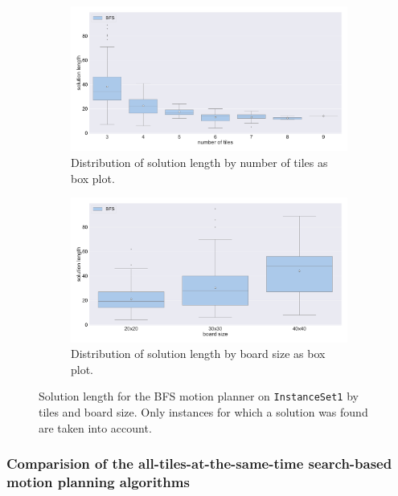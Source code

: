 \begin{figure}[H]
\begin{subfigure}[b]{\textwidth}
\centering
\includegraphics[width=\textwidth]{figures/plots/heuristic_solvers_i1/bfs_solution_length_over_tiles.pdf}
\caption{Distribution of solution length by number of tiles as box plot.}
\label{fig:bfs_solution_length_over_tiles}
\end{subfigure}
\begin{subfigure}[b]{\textwidth}
\centering
\includegraphics[width=\textwidth]{figures/plots/heuristic_solvers_i1/bfs_solution_length_over_board_size.pdf}
\caption{Distribution of solution length by board size as box plot.}
\label{fig:bfs_solution_length_over_board_size}
\end{subfigure}
\caption[Solution lengths for BFS motion planner on \texttt{InstanceSet1}]{Solution length for the BFS motion planner on \texttt{InstanceSet1} by tiles and board size. Only instances for which a solution was found are taken into account.}
\label{fig:bfs_performance3}
\end{figure}


\subsubsection {Comparision of the all-tiles-at-the-same-time search-based motion planning algorithms}


